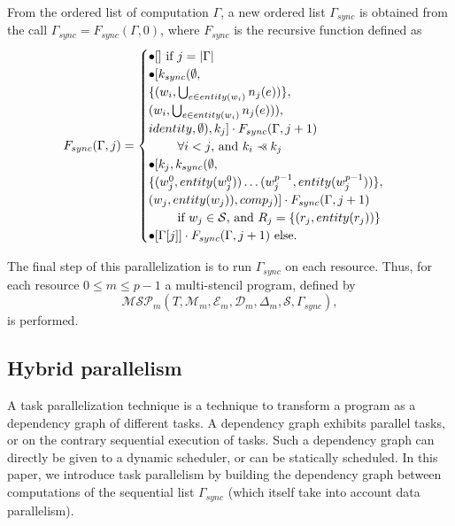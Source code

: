 \begin{mydef}
From the ordered list of computation $\Gamma$, a new ordered list $\Gamma_{sync}$ is obtained from the call $\Gamma_{sync} = F_{sync}(\Gamma,0)$, where $F_{sync}$ is the recursive function defined as
\begin{equation*}
F_{sync}(\Gamma,j) = 
\begin{cases} 	\bullet [] \mbox{ if }j=|\Gamma|\\
				\bullet [k_{sync}(\emptyset,\\
				\{(w_i,\bigcup_{e \in entity(w_i)} n_j(e))\},\\
				(w_i,\bigcup_{e \in entity(w_i)} n_j(e))),\\
				identity,\emptyset), k_j] \cdot F_{sync}(\Gamma,j+1)\\
				\text{ } \qquad \forall i<j \text{, and }k_i \pprec k_j\\
				\bullet [k_j, k_{sync}(\emptyset,\\
				\{(w^0_j,entity(w^0_j)) \dots (w^{p-1}_j,entity(w^{p-1}_j))\},\\
				(w_j,entity(w_j)),comp_j)] \cdot F_{sync}(\Gamma,j+1)\\ 
				\text{ } \qquad \mbox{if } w_j \in \mathcal{S} \text{, and } R_j=\{(r_j,entity(r_j))\}\\
				\bullet [\Gamma[j]] \cdot F_{sync}(\Gamma,j+1) \text{ else}.
\end{cases}
\end{equation*}
\end{mydef}


 The final step of this parallelization is to run $\Gamma_{sync}$ on each resource. Thus, for each resource $0 \leq m \leq p-1$ a multi-stencil program, defined by
\begin{equation}
\mathcal{MSP}_m(T,\mathcal{M}_m,\mathcal{E}_m,\mathcal{D}_m,\Delta_m,\mathcal{S},\Gamma_{sync}),
\end{equation}
is performed.

\subsection{Hybrid parallelism}
A task parallelization technique is a technique to transform a program as a dependency graph of different tasks. A dependency graph exhibits parallel tasks, or on the contrary sequential execution of tasks. Such a dependency graph can directly be given to a dynamic scheduler, or can be statically scheduled. In this paper, we introduce task parallelism by building the dependency graph between computations of the sequential list $\Gamma_{sync}$ (which itself take into account data parallelism).

